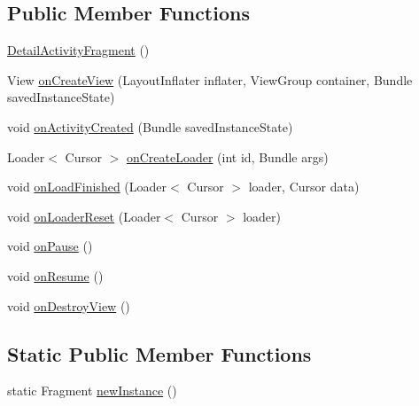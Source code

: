 \subsection*{Public Member Functions}
\begin{DoxyCompactItemize}
\item 
\hyperlink{classorg_1_1buildmlearn_1_1toolkit_1_1videocollectiontemplate_1_1fragment_1_1DetailActivityFragment_abe76ebeb3343a873f5739f24ba530f18}{Detail\+Activity\+Fragment} ()
\item 
View \hyperlink{classorg_1_1buildmlearn_1_1toolkit_1_1videocollectiontemplate_1_1fragment_1_1DetailActivityFragment_acdfaaf9ca7fa2b4b41bdfc4a7a8d15cc}{on\+Create\+View} (Layout\+Inflater inflater, View\+Group container, Bundle saved\+Instance\+State)
\item 
void \hyperlink{classorg_1_1buildmlearn_1_1toolkit_1_1videocollectiontemplate_1_1fragment_1_1DetailActivityFragment_a54f508dd91e2581dec3422c54f983e3b}{on\+Activity\+Created} (Bundle saved\+Instance\+State)
\item 
Loader$<$ Cursor $>$ \hyperlink{classorg_1_1buildmlearn_1_1toolkit_1_1videocollectiontemplate_1_1fragment_1_1DetailActivityFragment_afba2db59a7c5667b40056f4428f66546}{on\+Create\+Loader} (int id, Bundle args)
\item 
void \hyperlink{classorg_1_1buildmlearn_1_1toolkit_1_1videocollectiontemplate_1_1fragment_1_1DetailActivityFragment_aa66f11b2e7846c98669aa306165bc8b9}{on\+Load\+Finished} (Loader$<$ Cursor $>$ loader, Cursor data)
\item 
void \hyperlink{classorg_1_1buildmlearn_1_1toolkit_1_1videocollectiontemplate_1_1fragment_1_1DetailActivityFragment_a5d2cf553342d32d067bc5242169295df}{on\+Loader\+Reset} (Loader$<$ Cursor $>$ loader)
\item 
void \hyperlink{classorg_1_1buildmlearn_1_1toolkit_1_1videocollectiontemplate_1_1fragment_1_1DetailActivityFragment_a684fbe8fd0d220e9b2c623a03328af2f}{on\+Pause} ()
\item 
void \hyperlink{classorg_1_1buildmlearn_1_1toolkit_1_1videocollectiontemplate_1_1fragment_1_1DetailActivityFragment_a0362abe0b7b256974f1560e5bcc64198}{on\+Resume} ()
\item 
void \hyperlink{classorg_1_1buildmlearn_1_1toolkit_1_1videocollectiontemplate_1_1fragment_1_1DetailActivityFragment_a1ce2fbb55093b0ff8a3c1d9bcc36f5e8}{on\+Destroy\+View} ()
\end{DoxyCompactItemize}
\subsection*{Static Public Member Functions}
\begin{DoxyCompactItemize}
\item 
static Fragment \hyperlink{classorg_1_1buildmlearn_1_1toolkit_1_1videocollectiontemplate_1_1fragment_1_1DetailActivityFragment_a7742a47aa76323af0913a54e905b1666}{new\+Instance} ()
\end{DoxyCompactItemize}

